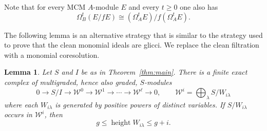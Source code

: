 \documentclass[11pt,letterpaper]{amsart}
\newcommand{\x}{\xrightarrow{}}
\DeclareMathOperator{\height}{height}
\theoremstyle{plain}
\newtheorem{lem}[thm]{Lemma}
\theoremstyle{definition}
\theoremstyle{remark}
\begin{document}
Note that for every MCM $A$-module $E$ and every $t\geq0$ one also has $$
 \Omega_B^t(E/fE)\cong(\Omega_A^tE)/f(\Omega_A^tE).$$

The following lemma is an alternative strategy that is similar to the strategy used to prove that the clean monomial ideals are glicci. We replace the clean filtration with a monomial coresolution. 

\begin{lem}\label{lem:irreducible}
Let $S$ and $I$ be as in Theorem~\ref{thm:main}. There is a finite
exact complex of multigraded, hence also graded, $S$-modules
\[
 0\x S/I\x\mathcal W^0\x\mathcal W^1
 \x\cdots\x\mathcal W^\ell\x0,
 \qquad
 \mathcal W^i=\bigoplus_\lambda S/W_{i\lambda}\]
where each $W_{i\lambda}$ is generated by positive powers of
distinct variables. If $S/W_{i\lambda}$ occurs in $\mathcal W^i$, then
\[
 g\leq\height W_{i\lambda}\leq g+i.
\]
\end{lem}
\end{document}
